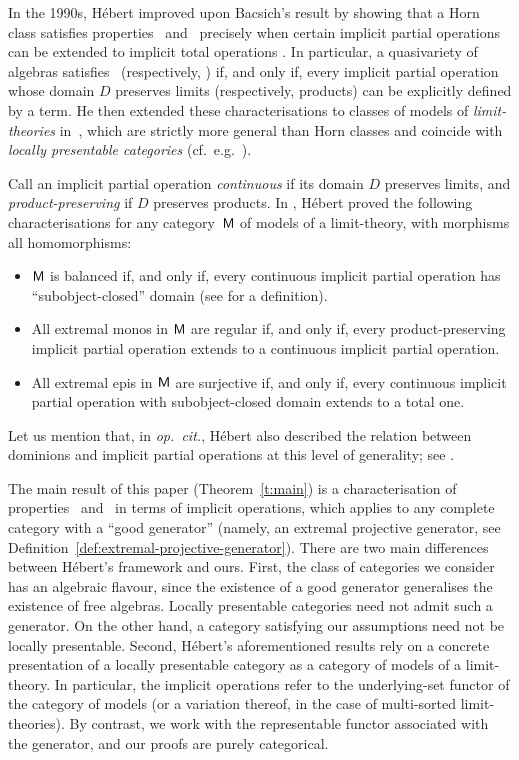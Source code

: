 \documentclass[a4paper,10pt,reqno]{amsart}
\theoremstyle{definition}
\theoremstyle{remark}
\begin{document}
In the 1990s, H{\'e}bert improved upon Bacsich's result by showing that a Horn class satisfies properties \ES~and \SES~precisely when certain implicit partial operations can be extended to implicit total operations \cite[Théorèmes~3.12, 3.13]{Hebert1993}. 
In particular, a quasivariety of algebras satisfies \ES~(respectively, \SES) if, and only if, every implicit partial operation whose domain $D$ preserves limits (respectively, products) can be explicitly defined by a term. 
%
He then extended these characterisations to classes of models of \emph{limit-theories} in~\cite{Hebert1998}, which are strictly more general than Horn classes and coincide with \emph{locally presentable categories} (cf.\ e.g.\ \cite{GabrielUlmer1971,ar94book}).
%

Call an implicit partial operation \emph{continuous} if its domain $D$ preserves limits, and \emph{product-preserving} if $D$ preserves products.
%
In \cite[Theorem~9]{Hebert1998}, H{\'e}bert proved the following characterisations for any category~${\sf M}$ of models of a limit-theory, with morphisms all homomorphisms:
%
\begin{itemize}
\item ${\sf M}$ is balanced if, and only if, every continuous implicit partial operation has ``subobject-closed'' domain (see \cite[Definition~4]{Hebert1998} for a definition).
\item All extremal monos in ${\sf M}$ are regular if, and only if, every product-preserving implicit partial operation extends to a continuous implicit partial operation.
\item All extremal epis in ${\sf M}$ are surjective if, and only if, every continuous implicit partial operation with subobject-closed domain extends to a total one.
\end{itemize}
%
Let us mention that, in \emph{op.~cit.}, H{\'e}bert also described the relation between dominions and implicit partial operations at this level of generality; see \cite[Theorem~8]{Hebert1998}.

\medskip
The main result of this paper (Theorem~\ref{t:main}) is a characterisation of properties \ES~and \SES~in terms of implicit operations, which applies to any complete category with a ``good generator'' (namely, an extremal projective generator, see Definition~\ref{def:extremal-projective-generator}). There are two main differences between H{\'e}bert's framework and ours. First, the class of categories we consider has an algebraic flavour, since the existence of a good generator generalises the existence of free algebras. Locally presentable categories need not admit such a generator. On the other hand, a category satisfying our assumptions need not be locally presentable. Second, H{\'e}bert's aforementioned results rely on a concrete presentation of a locally presentable category as a category of models of a limit-theory. In particular, the implicit operations refer to the underlying-set functor of the category of models (or a variation thereof, in the case of multi-sorted limit-theories). By contrast, we work with the representable functor associated with the generator, and our proofs are purely categorical.
\end{document}
